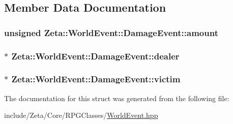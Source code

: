 \subsection{Member Data Documentation}
\hypertarget{structZeta_1_1WorldEvent_1_1DamageEvent_a975b2f7cd9156f2e20a57bbd32ed28c1}{
\subsubsection[{amount}]{\setlength{\rightskip}{0pt plus 5cm}unsigned Zeta\+::\+World\+Event\+::\+Damage\+Event\+::amount}}\label{structZeta_1_1WorldEvent_1_1DamageEvent_a975b2f7cd9156f2e20a57bbd32ed28c1}
\hypertarget{structZeta_1_1WorldEvent_1_1DamageEvent_aade109eb1787736c4058c174d744636a}{
\subsubsection[{dealer}]{$\ast$ Zeta\+::\+World\+Event\+::\+Damage\+Event\+::dealer}}\label{structZeta_1_1WorldEvent_1_1DamageEvent_aade109eb1787736c4058c174d744636a}
\hypertarget{structZeta_1_1WorldEvent_1_1DamageEvent_ad4e847d07d5ac8dce777c67366e1284d}{
\subsubsection[{victim}]{$\ast$ Zeta\+::\+World\+Event\+::\+Damage\+Event\+::victim}}\label{structZeta_1_1WorldEvent_1_1DamageEvent_ad4e847d07d5ac8dce777c67366e1284d}


The documentation for this struct was generated from the following file\+:\begin{DoxyCompactItemize}
\item 
include/\+Zeta/\+Core/\+R\+P\+G\+Classes/\hyperlink{WorldEvent_8hpp}{World\+Event.\+hpp}\end{DoxyCompactItemize}
